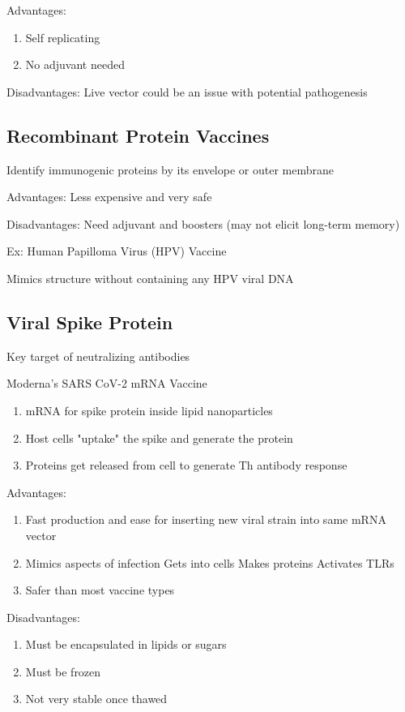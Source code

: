 \documentclass{notes}
\begin{document}
Advantages:
\begin{enumerate}
    \item Self replicating
    \item No adjuvant needed
\end{enumerate}

Disadvantages: Live vector could be an issue with potential pathogenesis

\subsection*{Recombinant Protein Vaccines}
Identify immunogenic proteins by its envelope or outer membrane

Advantages: Less expensive and very safe

Disadvantages: Need adjuvant and boosters (may not elicit long-term memory)

Ex: Human Papilloma Virus (HPV) Vaccine

\tab \indicates Mimics structure without containing any HPV viral DNA

\subsection*{Viral Spike Protein}
Key target of neutralizing antibodies

Moderna's SARS CoV-2 mRNA Vaccine
\begin{enumerate}
    \item mRNA for spike protein inside lipid nanoparticles
    \item Host cells "uptake" the spike and generate the protein
    \item Proteins get released from cell to generate Th antibody response
\end{enumerate}

Advantages:
\begin{enumerate}
    \item Fast production and ease for inserting new viral strain into same mRNA vector
    \item Mimics aspects of infection
    \subitem Gets into cells
    \subitem Makes proteins
    \subitem Activates TLRs
    \item Safer than most vaccine types
\end{enumerate}

Disadvantages:
\begin{enumerate}
    \item Must be encapsulated in lipids or sugars
    \item Must be frozen
    \item Not very stable once thawed
\end{enumerate}
\end{document}
